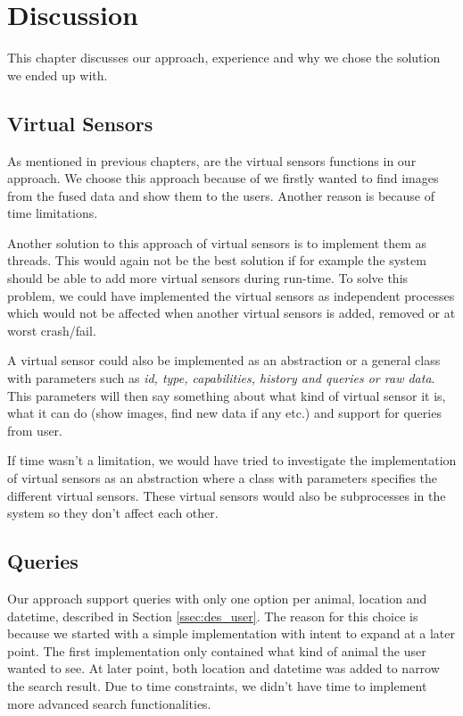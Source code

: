 \documentclass[USenglish]{uit-thesis}
\begin{document}
\chapter{Discussion}
This chapter discusses our approach, experience and why we chose the solution we ended up with.

\section{Virtual Sensors} \label{sec:disc_vs}
As mentioned in previous chapters, are the virtual sensors functions in our approach. We choose this approach because of we firstly wanted to find images from the fused data and show them to the users. Another reason is because of time limitations.


Another solution to this approach of virtual sensors is to implement them as threads. This would again not be the best solution if for example the system should be able to add more virtual sensors during run-time. To solve this problem, we could have implemented the virtual sensors as independent processes which would not be affected when another virtual sensors is added, removed or at worst crash/fail. 

A virtual sensor could also be implemented as an abstraction or a general class with parameters such as \textit{id, type, capabilities, history and queries or raw data}. This parameters will then say something about what kind of virtual sensor it is, what it can do (show images, find new data if any etc.) and support for queries from user.

If time wasn't a limitation, we would have tried to investigate the implementation of virtual sensors as an abstraction where a class with parameters specifies the different virtual sensors. These virtual sensors would also be subprocesses in the system so they don't affect each other. 


\section{Queries} \label{sec:disc_query}
Our approach support queries with only one option per animal, location and datetime, described in Section \ref{ssec:des_user}. The reason for this choice is because we started with a simple implementation with intent to expand at a later point. The first implementation only contained what kind of animal the user wanted to see. At later point, both location and datetime was added to narrow the search result. Due to time constraints, we didn't have time to implement more advanced search functionalities.
\end{document}
